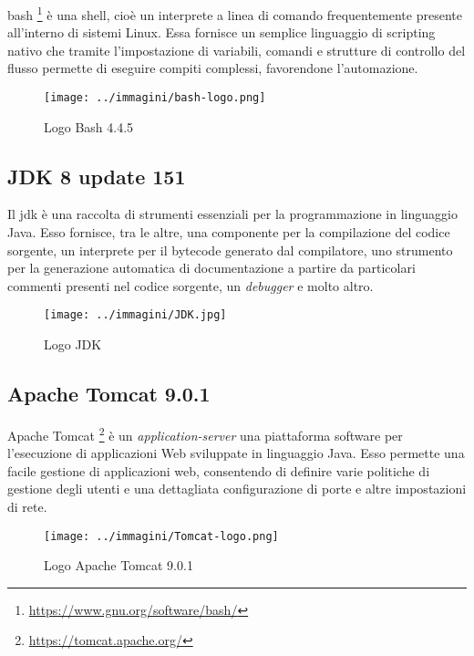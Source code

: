 \gls{bash} \footnote{\url{https://www.gnu.org/software/bash/}} è una shell, cioè un interprete a linea di comando frequentemente presente all'interno di sistemi \gls{Linux}. Essa fornisce un semplice linguaggio di scripting nativo che tramite l'impostazione di variabili, comandi e strutture di controllo del flusso permette di eseguire compiti complessi, favorendone l'automazione.

\begin{figure}[H]
    \capstart
    \centering
    \texttt{[image: ../immagini/bash-logo.png]}
    \caption{Logo Bash 4.4.5}
\end{figure}

\subsection{JDK 8 update 151}

Il \gls{jdk} è una raccolta di strumenti essenziali per la programmazione in linguaggio Java. Esso fornisce, tra le altre, una componente per la compilazione del codice sorgente, un interprete per il \gls{bytecode} generato dal compilatore, uno strumento per la generazione automatica di documentazione a partire da particolari commenti presenti nel codice sorgente, un \textit{\gls{debugger}} e molto altro.

\begin{figure}[H]
    \capstart
    \centering
    \texttt{[image: ../immagini/JDK.jpg]}
    \caption{Logo JDK}
\end{figure}

\subsection{Apache Tomcat 9.0.1}

Apache Tomcat \footnote{\url{https://tomcat.apache.org/}} è un \textit{\gls{application-server}} una piattaforma software per l'esecuzione di applicazioni Web sviluppate in linguaggio Java\cite{site:tomcat-minimalistic}. Esso permette una facile gestione di applicazioni web, consentendo di definire varie politiche di gestione degli utenti e una dettagliata configurazione di porte e altre impostazioni di rete.

\begin{figure}[H]
    \capstart
    \centering
    \texttt{[image: ../immagini/Tomcat-logo.png]}
    \caption{Logo Apache Tomcat 9.0.1}
\end{figure}

